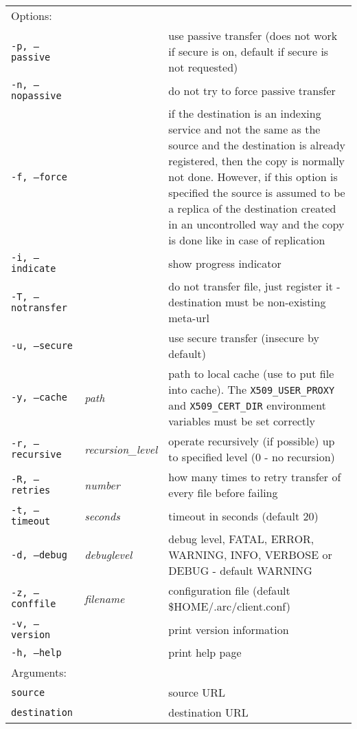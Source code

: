 \begin{longtable}{llp{8cm}}
    Options:&&\\
   \texttt{-p, --passive} && use passive transfer (does not work if secure is on, default if secure is not requested)\\
   \texttt{-n, --nopassive} && do not try to force passive transfer\\
   \texttt{-f, --force} && if the destination is an indexing service and not the same as the source and the destination is already registered, then the copy is normally not done. However, if this option is specified the source is assumed to be a replica of the destination created in an uncontrolled way and the copy is done like in case of replication\\
   \texttt{-i, --indicate} && show progress indicator\\
   \texttt{-T, --notransfer} && do not transfer file, just register it - destination must be non-existing meta-url\\
   \texttt{-u, --secure} && use secure transfer (insecure by default)\\
   \texttt{-y, --cache} &\textit{path} & path to local cache (use to put file into cache). The \texttt{X509\_USER\_PROXY} and \texttt{X509\_CERT\_DIR} environment variables must be set correctly\\
   \texttt{-r, --recursive} & \textit{recursion\_level} & operate recursively (if possible) up to specified level (0 - no recursion)\\
   \texttt{-R, --retries} & \textit{number} & how many times to retry transfer of every file before failing\\
   \texttt{-t, --timeout}&\textit{seconds}&timeout in seconds (default 20)\\
   \texttt{-d, --debug}&\textit{debuglevel}&debug level, FATAL, ERROR, WARNING, INFO, VERBOSE or DEBUG - default WARNING\\
   \texttt{-z, --conffile}&\textit{filename}& configuration file (default {\$}HOME/.arc/client.conf)\\
   \texttt{-v, --version}&&print version information\\
   \texttt{-h, --help}&&print help page\\
    Arguments:&&\\
    \texttt{source} && source URL\\
    \texttt{destination} && destination URL\\
\end{longtable}

